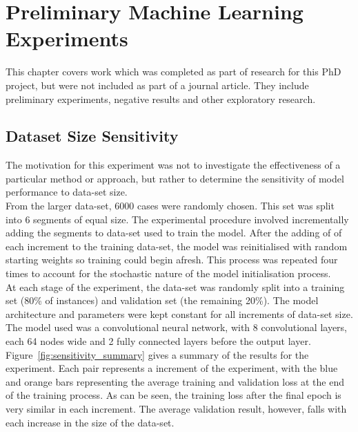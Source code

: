 \chapter{Preliminary Machine Learning Experiments}
\label{cha:preliminary}

This chapter covers work which was completed as part of research for this PhD project, but were not included as part of a journal article. They include preliminary experiments, negative results and other exploratory research. 

\section{Dataset Size Sensitivity}

\noindent The motivation for this experiment was not to investigate the effectiveness of a particular method or approach, but rather to determine the sensitivity of model performance to data-set size. \\

\noindent From the larger data-set, 6000 cases  were randomly chosen. This set was split into 6 segments of equal size. The experimental procedure involved incrementally adding the segments to data-set used to train the model. After the adding of of each increment to the training data-set, the model was reinitialised with random starting weights so training could begin afresh. This process was repeated four times to account for the stochastic nature of the model initialisation process. \\

\noindent At each stage of the experiment, the data-set was randomly split into a training set (80\% of instances) and validation set (the remaining 20\%). The model architecture and parameters were kept constant for all increments of data-set size. The model used was a convolutional neural network, with 8 convolutional layers, each 64 nodes wide and 2 fully connected layers before the output layer. 
\\

\noindent 
Figure~\ref{fig:sensitivity_summary} gives a summary of the results for the experiment. Each pair represents a increment of the experiment, with the blue and orange bars representing the average training and validation loss at the end of the training process. As can be seen, the training loss after the final epoch is very similar in each increment. The average validation result, however, falls with each increase in the size of the data-set. \\

